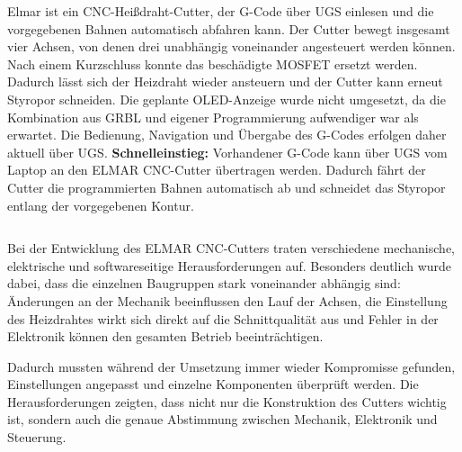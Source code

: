 \documentclass[25pt,a0paper, portrait]{tikzposter}
\begin{document}
\begin{columns}
{{				Elmar ist ein CNC-Heißdraht-Cutter, der G-Code über UGS einlesen und die vorgegebenen Bahnen automatisch abfahren kann. Der Cutter bewegt insgesamt vier Achsen, von denen drei unabhängig voneinander angesteuert werden können. Nach einem Kurzschluss konnte das beschädigte MOSFET ersetzt werden. Dadurch lässt sich der Heizdraht wieder ansteuern und der Cutter kann erneut Styropor schneiden. Die geplante OLED-Anzeige wurde nicht umgesetzt, da die Kombination aus GRBL und eigener Programmierung aufwendiger war als erwartet. Die Bedienung, Navigation und Übergabe des G-Codes erfolgen daher aktuell über UGS. \textbf{Schnelleinstieg:} Vorhandener G-Code kann über UGS vom Laptop an den ELMAR CNC-Cutter übertragen werden. Dadurch fährt der Cutter die programmierten Bahnen automatisch ab und schneidet das Styropor entlang der vorgegebenen Kontur.
			}
			
		}
		
	\end{columns}
	
	
		{
			Bei der Entwicklung des ELMAR CNC-Cutters traten verschiedene mechanische, elektrische und softwareseitige Herausforderungen auf. Besonders deutlich wurde dabei, dass die einzelnen Baugruppen stark voneinander abhängig sind: Änderungen an der Mechanik beeinflussen den Lauf der Achsen, die Einstellung des Heizdrahtes wirkt sich direkt auf die Schnittqualität aus und Fehler in der Elektronik können den gesamten Betrieb beeinträchtigen.
			
			Dadurch mussten während der Umsetzung immer wieder Kompromisse gefunden, Einstellungen angepasst und einzelne Komponenten überprüft werden. Die Herausforderungen zeigten, dass nicht nur die Konstruktion des Cutters wichtig ist, sondern auch die genaue Abstimmung zwischen Mechanik, Elektronik und Steuerung.
			
			
	}
	
\end{document}
